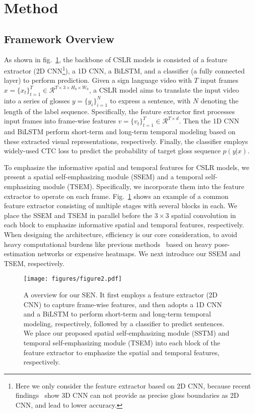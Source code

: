 \documentclass[letterpaper]{article} \usepackage{aaai23}  \usepackage{times}  \usepackage{helvet}  \usepackage{courier}  \usepackage[hyphens]{url}  \usepackage{graphicx} \urlstyle{rm} \def\UrlFont{\rm}  \usepackage{natbib}  \usepackage{caption} \frenchspacing  \setlength{\pdfpagewidth}{8.5in} \setlength{\pdfpageheight}{11in} \usepackage{algorithm}
\begin{document}
\section{Method}
\subsection{Framework Overview}
As shown in fig.~\ref{fig2}, the backbone of CSLR models is consisted of a feature extractor (2D CNN\footnote{Here we only consider the feature extractor based on 2D CNN, because recent findings~\cite{adaloglou2021comprehensive,zuo2022c2slr} show 3D CNN can not provide as precise gloss boundaries as 2D CNN, and lead to lower accuracy. }), a 1D CNN, a BiLSTM, and a classifier (a fully connected layer) to perform prediction. Given a sign language video with $T$ input frames $x = \{x_{t}\}_{t=1}^T \in \mathcal{R}^{T \times 3\times H_0 \times W_0} $, a CSLR model aims to translate the input video into a series of glosses $y=\{ y_i\}_{i=1}^{N}$ to express a sentence, with $N$ denoting the length of the label sequence. Specifically, the feature extractor first processes input frames into frame-wise features $v = \{v_t\}_{t=1}^{T} \in \mathcal{R}^{T\times d}$. Then the 1D CNN and BiLSTM perform short-term and long-term temporal modeling based on these extracted visual representations, respectively. Finally, the classifier employs widely-used CTC loss to predict the probability of target gloss sequence $p(y|x)$.

To emphasize the informative spatial and temporal features for CSLR models, we present a spatial self-emphasizing module (SSEM) and a temporal self-emphasizing module (TSEM). Specifically, we incorporate them into the feature extractor to operate on each frame. Fig.~\ref{fig2} shows an example of a common feature extractor consisting of multiple stages with several blocks in each. We place the SSEM and TSEM in parallel before the $3\times 3$ spatial convolution in each block to emphasize informative spatial and temporal features, respectively. When designing the architecture, efficiency is our core consideration, to avoid heavy computational burdens like previous methods~\cite{zhou2020spatial,zuo2022c2slr} based on heavy pose-estimation networks or expensive heatmaps. We next introduce our SSEM and TSEM, respectively. 

\begin{figure}[t]
\centering
\texttt{[image: figures/figure2.pdf]}
\caption{A overview for our SEN. It first employs a feature extractor (2D CNN) to capture frame-wise features, and then adopts a 1D CNN and a BiLSTM to perform short-term and long-term temporal modeling, respectively, followed by a classifier to predict sentences. We place our proposed spatial self-emphasizing module (SSTM) and temporal self-emphasizing module (TSEM) into each block of the feature extractor to emphasize the spatial and temporal features, respectively.}
\label{fig2}
\end{figure}
\end{document}
